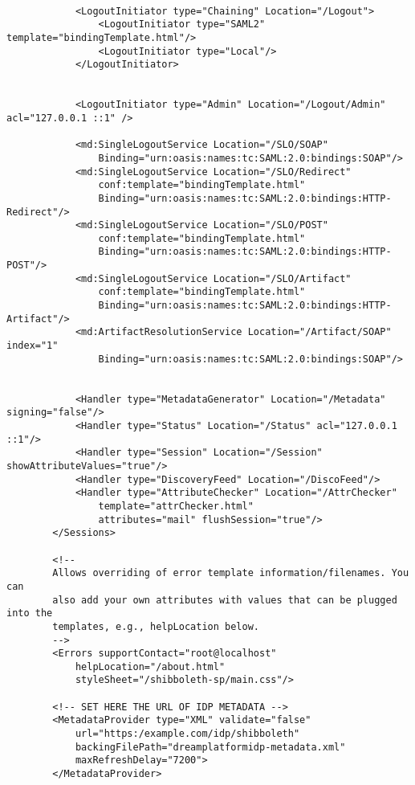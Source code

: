 \begin{verbatim}
            
            <LogoutInitiator type="Chaining" Location="/Logout">
                <LogoutInitiator type="SAML2" template="bindingTemplate.html"/>
                <LogoutInitiator type="Local"/>
            </LogoutInitiator>

                    
            <LogoutInitiator type="Admin" Location="/Logout/Admin" acl="127.0.0.1 ::1" />
                
            <md:SingleLogoutService Location="/SLO/SOAP"
                Binding="urn:oasis:names:tc:SAML:2.0:bindings:SOAP"/>
            <md:SingleLogoutService Location="/SLO/Redirect" 
                conf:template="bindingTemplate.html"
                Binding="urn:oasis:names:tc:SAML:2.0:bindings:HTTP-Redirect"/>
            <md:SingleLogoutService Location="/SLO/POST" 
                conf:template="bindingTemplate.html"
                Binding="urn:oasis:names:tc:SAML:2.0:bindings:HTTP-POST"/>
            <md:SingleLogoutService Location="/SLO/Artifact" 
                conf:template="bindingTemplate.html"
                Binding="urn:oasis:names:tc:SAML:2.0:bindings:HTTP-Artifact"/>
            <md:ArtifactResolutionService Location="/Artifact/SOAP" index="1"
                Binding="urn:oasis:names:tc:SAML:2.0:bindings:SOAP"/>

                       
            <Handler type="MetadataGenerator" Location="/Metadata" signing="false"/>
            <Handler type="Status" Location="/Status" acl="127.0.0.1 ::1"/>
            <Handler type="Session" Location="/Session" showAttributeValues="true"/>
            <Handler type="DiscoveryFeed" Location="/DiscoFeed"/>
            <Handler type="AttributeChecker" Location="/AttrChecker" 
                template="attrChecker.html"
                attributes="mail" flushSession="true"/>
        </Sessions>

        <!--
        Allows overriding of error template information/filenames. You can
        also add your own attributes with values that can be plugged into the
        templates, e.g., helpLocation below.
        -->
        <Errors supportContact="root@localhost"
            helpLocation="/about.html"
            styleSheet="/shibboleth-sp/main.css"/>

        <!-- SET HERE THE URL OF IDP METADATA -->
        <MetadataProvider type="XML" validate="false" 
            url="https:/example.com/idp/shibboleth" 
            backingFilePath="dreamplatformidp-metadata.xml" 
            maxRefreshDelay="7200">
        </MetadataProvider>
        

\end{verbatim}
